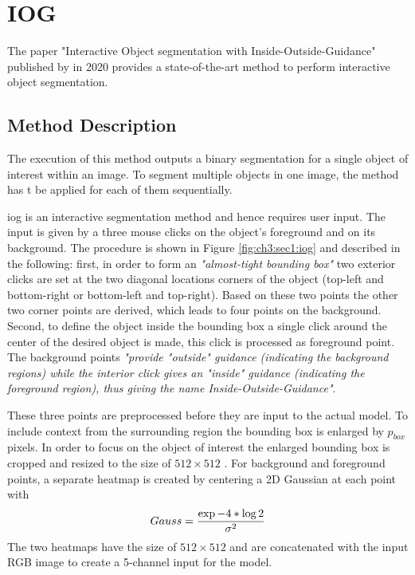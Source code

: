 
\section{IOG}\label{ord:ch3:sec4}

The paper "Interactive Object segmentation with Inside-Outside-Guidance"\cite{Zha20-IOG} published by \citeauthor{Zha20-IOG} \etal in 2020 provides a state-of-the-art method to perform interactive object segmentation.

\subsection{Method Description}\label{ord:ch3:sec1:subsec1}
The execution of this method outputs a binary segmentation for a single object of interest within an image. 
To segment multiple objects in one image, the method has t be applied for each of them sequentially.

\gls{iog} is an interactive segmentation method and hence requires user input. 
The input is given by a three mouse clicks on the object's foreground and on its background.
The procedure is shown in Figure \ref{fig:ch3:sec1:iog} and described in the following:
first, in order to form an \emph{"almost-tight bounding box"}\cite[p. 12235]{Zha20-IOG} two exterior clicks are set at the two diagonal locations corners of the object (top-left and bottom-right or bottom-left and top-right).
Based on these two points the other two corner points are derived, which leads to four points on the background. 
Second, to define the object inside the bounding box a single click around the center of the desired object is made, this click is processed as foreground point. 
The background points \emph{"provide "outside" guidance (indicating the background regions) while the interior click gives an "inside" guidance (indicating the foreground region), thus giving the name \textit{Inside-Outside-Guidance}"}\cite[p. 12235]{Zha20-IOG}.

These three points are preprocessed before they are input to the actual model. To include context from the surrounding region the bounding box is enlarged by $p_{{box}}$ pixels. 
In order to focus on the object of interest the enlarged bounding box is cropped and resized to the size of $512 \times 512$ . 
For background and foreground points, a separate heatmap is created by centering a 2D Gaussian at each point with
\begin{equation} \label{equ:gauss}
	\centering
	Gauss = \frac{\exp{-4 * \log 2 }}{\sigma^{2}}
\end{equation}
The two heatmaps have the size of $512 \times 512$  and are concatenated with the input RGB image to create a 5-channel input for the model. 

